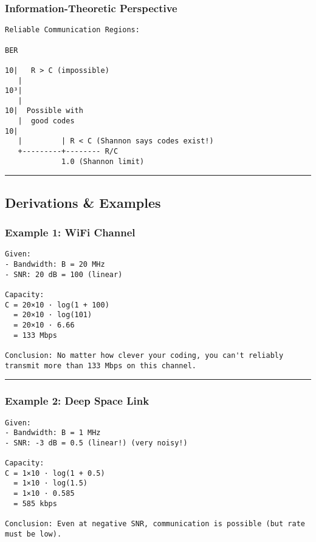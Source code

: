 \subsubsection{Information-Theoretic
Perspective}\label{information-theoretic-perspective}

\begin{verbatim}
Reliable Communication Regions:

BER
 
10|   R > C (impossible)
   |
10³|
   |
10|  Possible with
   |  good codes
10|         
   |         | R < C (Shannon says codes exist!)
   +---------+-------- R/C
             1.0 (Shannon limit)
\end{verbatim}

\begin{center}\rule{0.5\linewidth}{0.5pt}\end{center}

\subsection{\texorpdfstring{ Derivations \&
Examples}{ Derivations \& Examples}}\label{derivations-examples}

\subsubsection{Example 1: WiFi Channel}\label{example-1-wifi-channel}

\begin{verbatim}
Given:
- Bandwidth: B = 20 MHz
- SNR: 20 dB = 100 (linear)

Capacity:
C = 20×10 · log(1 + 100)
  = 20×10 · log(101)
  = 20×10 · 6.66
  = 133 Mbps

Conclusion: No matter how clever your coding, you can't reliably transmit more than 133 Mbps on this channel.
\end{verbatim}

\begin{center}\rule{0.5\linewidth}{0.5pt}\end{center}

\subsubsection{Example 2: Deep Space
Link}\label{example-2-deep-space-link}

\begin{verbatim}
Given:
- Bandwidth: B = 1 MHz
- SNR: -3 dB = 0.5 (linear!) (very noisy!)

Capacity:
C = 1×10 · log(1 + 0.5)
  = 1×10 · log(1.5)
  = 1×10 · 0.585
  = 585 kbps

Conclusion: Even at negative SNR, communication is possible (but rate must be low).
\end{verbatim}

